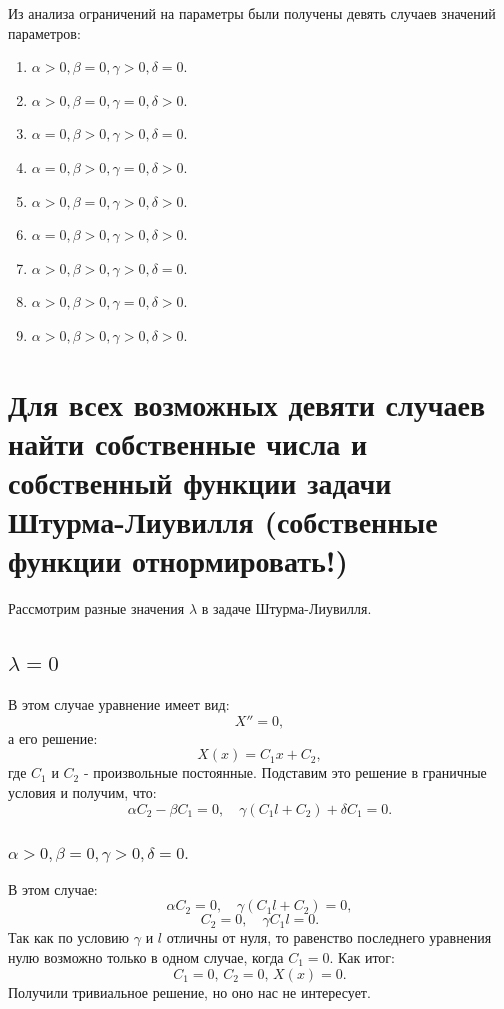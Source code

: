 \documentclass[12pt, a4paper]{report}
\begin{document}
Из анализа ограничений на параметры были получены девять случаев значений параметров:
\begin{enumerate}
	\item $ \alpha > 0, \beta = 0, \gamma > 0, \delta = 0. $
	\item $ \alpha > 0, \beta = 0, \gamma = 0, \delta > 0. $
	\item $ \alpha = 0, \beta > 0, \gamma > 0, \delta = 0. $
	\item $ \alpha = 0, \beta > 0, \gamma = 0, \delta > 0. $
	\item $ \alpha > 0, \beta = 0, \gamma > 0, \delta > 0. $
	\item $ \alpha = 0, \beta > 0, \gamma > 0, \delta > 0. $
	\item $ \alpha > 0, \beta > 0, \gamma > 0, \delta = 0. $
	\item $ \alpha > 0, \beta > 0, \gamma = 0, \delta > 0. $
	\item $ \alpha > 0, \beta > 0, \gamma > 0, \delta > 0. $
\end{enumerate}


\section{Для всех возможных девяти случаев найти собственные числа и собственный функции задачи Штурма-Лиувилля (собственные функции отнормировать!)}


Рассмотрим разные значения $\lambda$ в задаче Штурма-Лиувилля.
\subsection{$\lambda = 0$}
В этом случае уравнение имеет вид:
\[ X'' = 0, \]
а его решение:
\[ X(x) = C_{1} x + C_{2}, \]
где $C_{1}$ и $C_{2}$ - произвольные постоянные. Подставим это решение в граничные условия и получим, что:
\[\alpha C_{2} - \beta C_{1} = 0, \quad \gamma (C_{1} l + C_{2}) + \delta C_{1} = 0. \]

\subsubsection{$ \alpha > 0, \beta = 0, \gamma > 0, \delta = 0.$}
В этом случае:
\[\alpha C_{2} = 0, \quad \gamma (C_{1} l + C_{2}) = 0, \]
\[ C_{2} = 0, \quad  \gamma C_{1} l = 0. \]
Так как по условию $\gamma$ и $l$ отличны от нуля, то равенство последнего уравнения нулю возможно только в одном случае, когда $C_{1} = 0$. Как итог:
\[ C_{1} = 0, \, C_{2} = 0, \, X(x) = 0. \]
Получили тривиальное решение, но оно нас не интересует.
\end{document}
